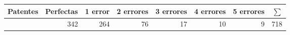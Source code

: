 \begin{tabular}{lrrrrrrr}
    \toprule
    Patentes & Perfectas & 1 error & 2 errores & 3 errores & 4 errores & 5 errores & $\sum$ \\
    \midrule
             & 342       & 264     & 76        & 17        & 10        & 9         & 718    \\
    \bottomrule
\end{tabular}

